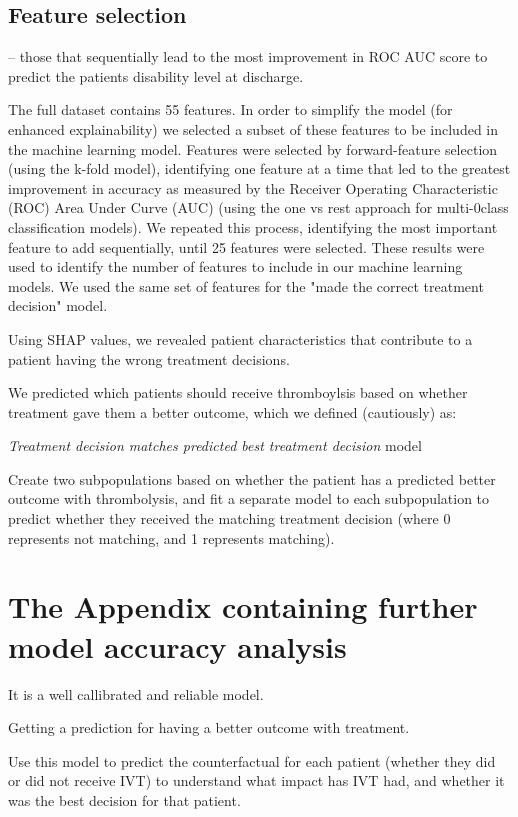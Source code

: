 \subsection{Feature selection}
 – those that sequentially lead to the most improvement in ROC AUC score to predict the patients disability level at discharge. 

The full dataset contains 55 features. In order to simplify the model (for enhanced explainability) we selected a subset of these features to be included in the machine learning model. Features were selected by forward-feature selection (using the k-fold model), identifying one feature at a time that led to the greatest improvement in accuracy as measured by the Receiver Operating Characteristic (ROC) Area Under Curve (AUC) (using the one vs rest approach for multi-0class classification models). We repeated this process, identifying the most important feature to add sequentially, until 25 features were selected. These results were used to identify the number of features to include in our machine learning models. We used the same set of features for the "made the correct treatment decision" model.

Using SHAP values, we revealed patient characteristics that contribute to a patient having the wrong treatment decisions.

We predicted which patients should receive thromboylsis based on whether treatment gave them a better outcome, which we defined (cautiously) as: 



\textit{Treatment decision matches predicted best treatment decision} model



Create two subpopulations based on whether the patient has a predicted better outcome with thrombolysis, and fit a separate model to each subpopulation to predict whether they received the matching treatment decision (where 0 represents not matching, and 1 represents matching).


\section{The Appendix containing further model accuracy analysis}

It is a well callibrated and reliable model.

\item Getting a prediction for having a better outcome with treatment.   

Use this model to predict the counterfactual for each patient (whether they did or did not receive IVT) to understand what impact has IVT had, and whether it was the best decision for that patient.

